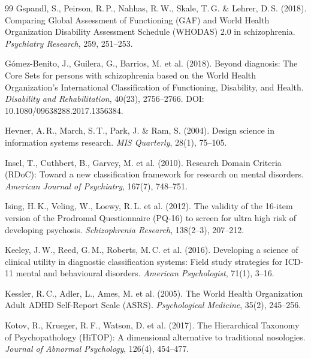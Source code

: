 \documentclass[11pt,a4paper]{article}
\begin{document}
\begin{thebibliography}{99}
Gspandl, S., Peirson, R.\,P., Nahhas, R.\,W., Skale, T.\,G. \& Lehrer, D.\,S. (2018).
\newblock Comparing Global Assessment of Functioning (GAF) and World Health Organization Disability Assessment Schedule (WHODAS) 2.0 in schizophrenia.
\newblock \textit{Psychiatry Research}, 259, 251--253.

G{\'o}mez-Benito, J., Guilera, G., Barrios, M. et al. (2018).
\newblock Beyond diagnosis: The Core Sets for persons with schizophrenia based on the World Health Organization's International Classification of Functioning, Disability, and Health.
\newblock \textit{Disability and Rehabilitation}, 40(23), 2756--2766. DOI: 10.1080/09638288.2017.1356384.

Hevner, A.\,R., March, S.\,T., Park, J. \& Ram, S. (2004).
\newblock Design science in information systems research.
\newblock \textit{MIS Quarterly}, 28(1), 75--105.

Insel, T., Cuthbert, B., Garvey, M. et al. (2010).
\newblock Research Domain Criteria (RDoC): Toward a new classification framework for research on mental disorders.
\newblock \textit{American Journal of Psychiatry}, 167(7), 748--751.

Ising, H.\,K., Veling, W., Loewy, R.\,L. et al. (2012).
\newblock The validity of the 16-item version of the Prodromal Questionnaire (PQ-16) to screen for ultra high risk of developing psychosis.
\newblock \textit{Schizophrenia Research}, 138(2--3), 207--212.

Keeley, J.\,W., Reed, G.\,M., Roberts, M.\,C. et al. (2016).
\newblock Developing a science of clinical utility in diagnostic classification systems: Field study strategies for ICD-11 mental and behavioural disorders.
\newblock \textit{American Psychologist}, 71(1), 3--16.

Kessler, R.\,C., Adler, L., Ames, M. et al. (2005).
\newblock The World Health Organization Adult ADHD Self-Report Scale (ASRS).
\newblock \textit{Psychological Medicine}, 35(2), 245--256.

Kotov, R., Krueger, R.\,F., Watson, D. et al. (2017).
\newblock The Hierarchical Taxonomy of Psychopathology (HiTOP): A dimensional alternative to traditional nosologies.
\newblock \textit{Journal of Abnormal Psychology}, 126(4), 454--477.


\end{thebibliography}
\end{document}
